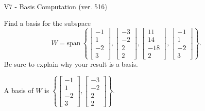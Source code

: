 \begin{exercise}
  \begin{exerciseTitle}V7 - Basis Computation (ver. 516)\end{exerciseTitle}
  \begin{exerciseStatement}
    Find a basis for the subspace 
\[W=\mathrm{span}\ \left\{\left[\begin{array}{r}
-1 \\
1 \\
-2 \\
3
\end{array}\right] , \left[\begin{array}{r}
-3 \\
-2 \\
2 \\
2
\end{array}\right] , \left[\begin{array}{r}
11 \\
14 \\
-18 \\
2
\end{array}\right] , \left[\begin{array}{r}
-1 \\
1 \\
-2 \\
3
\end{array}\right]\right\}.\]
 Be sure to explain why your result is a basis.


  \end{exerciseStatement}
  \begin{exerciseAnswer}
   A basis of \(W\) is  \(\left\{\left[\begin{array}{r}
-1 \\
1 \\
-2 \\
3
\end{array}\right] , \left[\begin{array}{r}
-3 \\
-2 \\
2 \\
2
\end{array}\right]\right\}\).
  


  \end{exerciseAnswer}
\end{exercise}